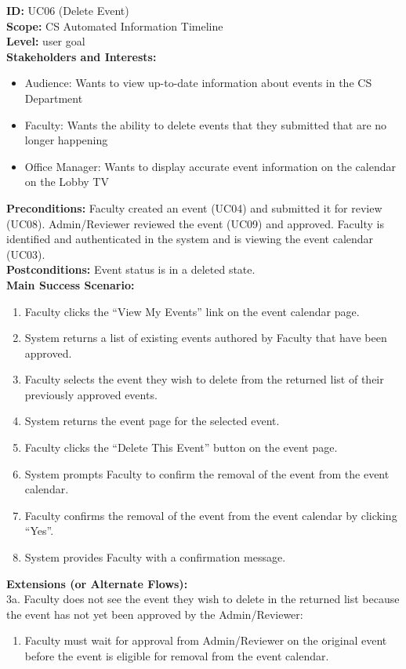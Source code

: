 \textbf{ID:} UC06 (Delete Event) \\
\textbf{Scope:} CS Automated Information Timeline \\
\textbf{Level:} user goal \\
\textbf{Stakeholders and Interests:}
\begin{itemize}
    \item Audience: Wants to view up-to-date information about events in the CS Department
    \item Faculty: Wants the ability to delete events that they submitted that are no longer happening
    \item Office Manager: Wants to display accurate event information on the calendar on the Lobby TV
\end{itemize}
\textbf{Preconditions:} Faculty created an event (UC04) and submitted it for review (UC08). Admin/Reviewer reviewed the event (UC09) and approved. Faculty is identified and authenticated in the system and is viewing the event calendar (UC03). \\
\textbf{Postconditions:} Event status is in a deleted state. \\
\textbf{Main Success Scenario:}
\begin{enumerate}
    \item Faculty clicks the ``View My Events'' link on the event calendar page.
    \item System returns a list of existing events authored by Faculty that have been approved.
    \item Faculty selects the event they wish to delete from the returned list of their previously approved events.
    \item System returns the event page for the selected event.
    \item Faculty clicks the ``Delete This Event'' button on the event page.
    \item System prompts Faculty to confirm the removal of the event from the event calendar.
    \item Faculty confirms the removal of the event from the event calendar by clicking ``Yes''.
    \item System provides Faculty with a confirmation message.
\end{enumerate}
\textbf{Extensions (or Alternate Flows):} \\
3a. Faculty does not see the event they wish to delete in the returned list because the event has not yet been approved by the Admin/Reviewer:
\begin{enumerate}
    \item Faculty must wait for approval from Admin/Reviewer on the original event before the event is eligible for removal from the event calendar.
\end{enumerate}
